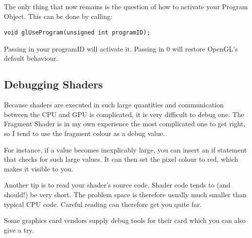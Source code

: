 The only thing that now remains is the question of how to activate your Program Object. This can be done by calling:

\begin{verbatim}
void glUseProgram(unsigned int programID);
\end{verbatim}

Passing in your programID will activate it. Passing in 0 will restore OpenGL's default behaviour.

\subsection{Debugging Shaders}

Because shaders are executed in such large quantities and communication between the CPU and GPU is complicated, it is very difficult to debug one. The Fragment Shader is in my own experience the most complicated one to get right, so I tend to use the fragment colour as a debug value. 

For instance, if a value becomes inexplicably large, you can insert an if statement that checks for such large values. It can then set the pixel colour to red, which makes it visible to you.

Another tip is to read your shader's source code. Shader code tends to (and should!) be very short. The problem space is therefore usually much smaller than typical CPU code. Careful reading can therefore get you quite far.

Some graphics card vendors supply debug tools for their card which you can also give a try.